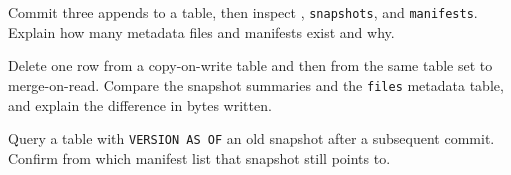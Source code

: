 \exercisehead
\begin{exercises}
\item Commit three appends to a table, then inspect ,
      \texttt{snapshots}, and \texttt{manifests}. Explain how many metadata files
      and manifests exist and why.
\item Delete one row from a copy-on-write table and then from the same table
      set to merge-on-read. Compare the snapshot summaries and the \texttt{files}
      metadata table, and explain the difference in bytes written.
\item Query a table with \texttt{VERSION AS OF} an old snapshot after a
      subsequent commit. Confirm from  which
      manifest list that snapshot still points to.
\end{exercises}
